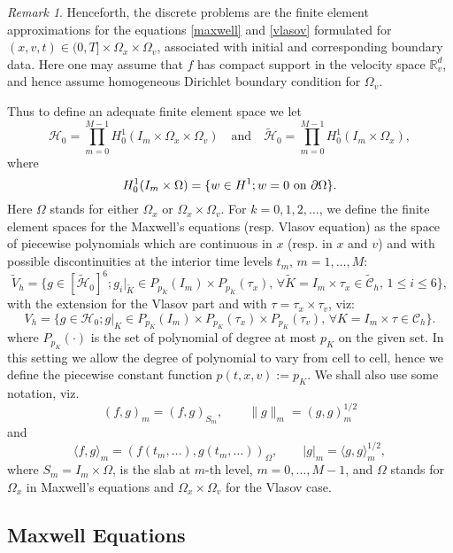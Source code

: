 \documentclass[reqno,a4paper]{amsart}
\theoremstyle{remark}
\newtheorem{remark}[theorem]{Remark}
\numberwithin{equation}{section}
\newcommand{\sprod}[2]{\langle #1, #2 \rangle}
\def\d{\partial}
\def\Kt{\tilde{K}}
\begin{document}
\begin{remark}
Henceforth, the discrete problems are the  
finite element approximations for the equations \eqref{maxwell} and 
\eqref{vlasov} formulated for 
$(x,v,t)\in (0, T] \times { \Omega_x}\times {\Omega_v}$, 
associated with initial and corresponding boundary data. 
Here one may assume that $f$ has compact support in the 
velocity space $ {\mathbb R}_v^d$, and hence assume homogeneous 
Dirichlet boundary 
condition for $\Omega_v$. 
\end{remark}

Thus to define an adequate finite element space we let 
%
\[
\mathcal{H}_0 = \prod_{m=0}^{M-1} H_0^1 
(I_m \times \Omega_x \times \Omega_v)\quad 
\mbox{and} \quad \mathcal{\tilde{H}}_0 = 
\prod_{m=0}^{M-1} H^1_0 ( I_m \times \Omega_x ),
\]
where
\[
H^1_0 (I_m \times \Omega) = \{ w \in H^1 ; 
w= 0 \, \, \textnormal{on} \,\, \d \Omega \}.
\]
Here $ \Omega $ stands for either $ \Omega_x $ or 
$ \Omega_x \times \Omega_v $. For $ k=0,1,2, \ldots $, 
we define the finite element spaces for the Maxwell's 
equations (resp. Vlasov equation) as the space of piecewise polynomials which are 
continuous in $x$ (resp. in $x$ and $v$) and with possible discontinuities at the 
interior time levels $t_m, \, m=1, \ldots , M$:
%
\[ 
\tilde{V}_h= \{ g \in [\mathcal{\tilde{H}}_0]^6 ;
g_i|_{\Kt} \in P_{p_{\Kt}} (I_m) \times P_{p_{\Kt}} (\tau_x ) ,
\, \forall \Kt = I_m \times \tau_x \in \mathcal{\tilde{C}}_h , \, 1\le i\le 6\},
\]
%
with the extension for the Vlasov part and with 
$\tau=\tau_x\times\tau_v$, viz:
%
\[ 
{V}_h= \{ g \in \mathcal{H}_0 ; g|_{K} 
\in P_{p_K} (I_m) \times P_{p_K} (\tau_x )\times P_{p_K} (\tau_v)  , \, \forall K = I_m \times \tau \in \mathcal{C}_h \}.
\]
%
where $ P_{p_K} ( \cdot ) $ is the set of polynomial of degree at most 
$ p_K $ on the given set. In this setting we allow the degree of polynomial
to vary from cell to cell, hence we define the piecewise constant function
$p(t,x,v):=p_K$.
We shall also use some notation, viz.
%
\[
(f,g)_m=(f,g)_{S_m}, \qquad \| g \|_m =(g,g)_m^{1/2}
\]
%
and
\[
\sprod{f}{g}_m=(f(t_m, \ldots), g(t_m, \ldots))_{\Omega}, \qquad |g|_m=
\sprod{g}{g}_m^{1/2},
\]
where $ S_m = I_m \times \Omega $, is the slab at $ m $-th level, 
$ m=0, \ldots, M-1 $, and $\Omega $ stands for $\Omega_x$
in Maxwell's equations and $\Omega_x\times \Omega_v$ for the Vlasov case. 


\subsection{Maxwell Equations} \label{secmax}
\end{document}
